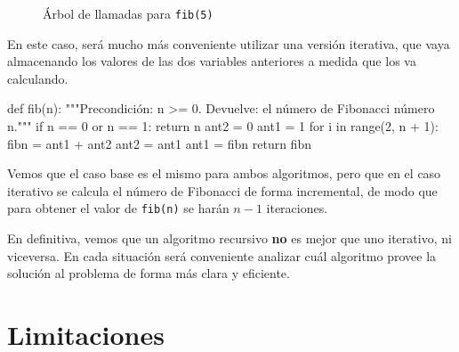 \begin{figure}[htb]
\caption{Árbol de llamadas para \lstinline!fib(5)!}
\label{fibonacci}
\end{figure}

En este caso, será mucho más conveniente utilizar una versión iterativa,
que vaya almacenando los valores de las dos variables anteriores a medida
que los va calculando.

\begin{codigo-python-sn}
def fib(n):
    """Precondición: n >= 0.
       Devuelve: el número de Fibonacci número n."""
    if n == 0 or n == 1:
        return n
    ant2 = 0
    ant1 = 1
    for i in range(2, n + 1):
        fibn = ant1 + ant2
        ant2 = ant1
        ant1 = fibn
    return fibn
\end{codigo-python-sn}

Vemos que el caso base es el mismo para ambos algoritmos, pero que en el
caso iterativo se calcula el número de Fibonacci de forma incremental, de
modo que para obtener el valor de \lstinline!fib(n)! se harán $n-1$
iteraciones.

\begin{atencion}
En definitiva, vemos que un algoritmo recursivo {\bf no} es mejor que uno
iterativo, ni viceversa.  En cada situación será conveniente analizar cuál
algoritmo provee la solución al problema de forma más clara y eficiente.
\end{atencion}

\section{Limitaciones}

